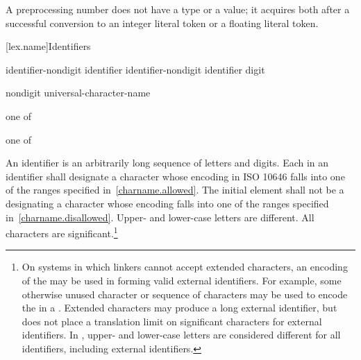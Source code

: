 \pnum
A preprocessing number does not have a type or a value; it acquires both
after a successful conversion to an integer literal token or a floating literal
token.%

[lex.name]{Identifiers}

%
\begin{bnf}
\br
    identifier-nondigit\br
    identifier identifier-nondigit\br
    identifier digit
\end{bnf}

\begin{bnf}
\br
    nondigit\br
    universal-character-name
\end{bnf}

\begin{bnf}
 \textnormal{one of}\br
    \br
    \br
    \br
\end{bnf}

\begin{bnf}
 \textnormal{one of}\br
\end{bnf}

\pnum
{}%
%
An identifier is an arbitrarily long sequence of letters and digits.
Each  in an identifier shall designate a
character whose encoding in ISO 10646 falls into one of the ranges
specified in~\ref{charname.allowed}.
The initial element shall not be a 
designating a character whose encoding falls into one of the ranges
specified in~\ref{charname.disallowed}.
Upper- and lower-case letters are
different. All characters are significant.\footnote{On systems in which linkers cannot accept extended
characters, an encoding of the  may be used in
forming valid external identifiers. For example, some otherwise unused
character or sequence of characters may be used to encode the
 in a . Extended
characters may produce a long external identifier, but \Cpp does not
place a translation limit on significant characters for external
identifiers. In \Cpp, upper- and lower-case letters are considered
different for all identifiers, including external identifiers. }

